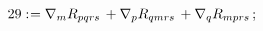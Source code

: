 \documentclass[11pt]{article}
\def\specialcolon{\mathrel{\mathop{:}}\hspace{-.5em}}
\begin{document}
\begin{dmath*}[compact, spread=2pt]
29\specialcolon{}= {\nabla}_{m}{{R}_{p q r s}}\,  + {\nabla}_{p}{{R}_{q m r s}}\,  + {\nabla}_{q}{{R}_{m p r s}}\, ;
\end{dmath*}
\end{document}
